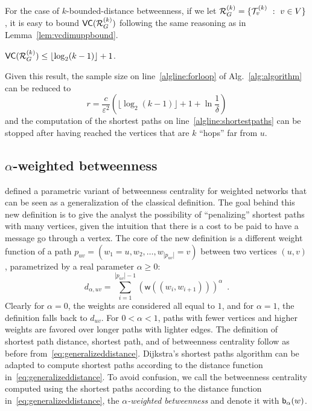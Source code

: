 For the case of $k$-bounded-distance betweenness, if we let
$\mathcal{R}_G^{(k)}=\{\mathcal{T}_v^{(k)}~:~ v\in V\}$, it is easy to bound
$\mathsf{VC}(\mathcal{R}_G^{(k)})$ following the same reasoning as in
Lemma~\ref{lem:vcdimuppbound}.
\begin{lemma}\label{lem:vcdimuppboundk}
$\mathsf{VC}(\mathcal{R}_G^{(k)})\le\lfloor\log_2(k-1)\rfloor+1$.
\end{lemma}

Given this result, the sample size on line~\ref{algline:forloop}
of Alg.~\ref{alg:algorithm} can be reduced to 
\[ 
  r= \frac{c}{\varepsilon^2}\left(\lfloor\log_2(k-1)\rfloor + 1 +\ln\frac{1}{\delta}\right)
\]
and the computation of the shortest paths on line~\ref{algline:shortestpaths}
can be stopped after having reached the vertices that are $k$ ``hops'' far from $u$.

\subsection{$\alpha$-weighted betweenness}
\citet{OpsahlAS10} defined a parametric variant of betweenness centrality for
weighted networks that can be seen as a generalization of the classical 
definition. The goal behind this new definition is to give the analyst the
possibility of ``penalizing'' shortest paths with many vertices, given the
intuition that there is a cost to be paid to have a message go through a vertex.
The core of the new definition is a different weight function of a path
$p_{uv}=(w_1=u,w_2,\dotsc,w_{|p_{uv}|}=v)$ between two vertices $(u,v)$,
parametrized by a real parameter $\alpha\ge 0$:
\begin{equation}\label{eq:generalizeddistance}
d_{\alpha,uv}=\sum_{i=1}^{|p_{uv}|-1}(\mathsf{w}((w_i,w_{i+1})))^\alpha\enspace. 
\end{equation}
Clearly for $\alpha=0$, the weights are considered all equal to $1$, and for
$\alpha=1$, the definition falls back to $d_{uv}$. For $0<\alpha<1$, paths with
fewer vertices and higher weights are favored over longer paths with lighter
edges\citep{OpsahlAS10}. The definition of shortest path distance, shortest
path, and of betweenness centrality follow as before
from~\eqref{eq:generalizeddistance}. Dijkstra's shortest paths algorithm can be
adapted to compute shortest paths according to the distance function
in~\eqref{eq:generalizeddistance}. To avoid confusion, we call the betweenness
centrality computed using the shortest paths according to the distance function
in~\eqref{eq:generalizeddistance}, the \emph{$\alpha$-weighted betweenness} and
denote it with $\mathsf{b}_\alpha(w)$. 

